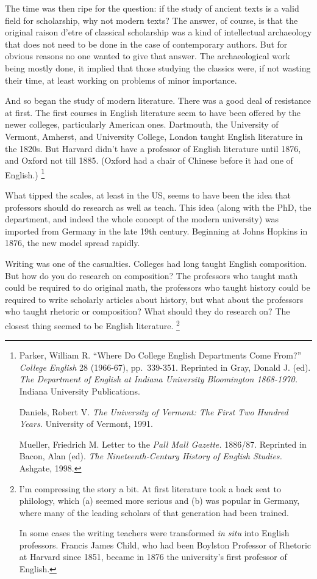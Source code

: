 The time was then ripe for the question: if the study of ancient texts
is a valid field for scholarship, why not modern texts? The answer, of
course, is that the original raison d'etre of classical scholarship was
a kind of intellectual archaeology that does not need to be done in the
case of contemporary authors. But for obvious reasons no one wanted to
give that answer. The archaeological work being mostly done, it implied
that those studying the classics were, if not wasting their time, at
least working on problems of minor importance.

And so began the study of modern literature. There was a good deal of
resistance at first. The first courses in English literature seem to
have been offered by the newer colleges, particularly American ones.
Dartmouth, the University of Vermont, Amherst, and University College,
London taught English literature in the 1820s. But Harvard didn't have a
professor of English literature until 1876, and Oxford not till 1885.
(Oxford had a chair of Chinese before it had one of English.) \footnote{Parker, William R. ``Where Do College English Departments Come
From?'' \emph{College English} 28 (1966-67), pp.~339-351. Reprinted in
Gray, Donald J. (ed). \emph{The Department of English at Indiana
University Bloomington 1868-1970.} Indiana University Publications.

Daniels, Robert V. \emph{The University of Vermont: The First Two
Hundred Years.} University of Vermont, 1991.

Mueller, Friedrich M. Letter to the \emph{Pall Mall Gazette.} 1886/87.
Reprinted in Bacon, Alan (ed). \emph{The Nineteenth-Century History of
English Studies.} Ashgate, 1998.}

What tipped the scales, at least in the US, seems to have been the idea
that professors should do research as well as teach. This idea (along
with the PhD, the department, and indeed the whole concept of the modern
university) was imported from Germany in the late 19th century.
Beginning at Johns Hopkins in 1876, the new model spread rapidly.

Writing was one of the casualties. Colleges had long taught English
composition. But how do you do research on composition? The professors
who taught math could be required to do original math, the professors
who taught history could be required to write scholarly articles about
history, but what about the professors who taught rhetoric or
composition? What should they do research on? The closest thing seemed
to be English literature. \footnote{I'm compressing the story a bit. At first literature took a back
seat to philology, which (a) seemed more serious and (b) was popular in
Germany, where many of the leading scholars of that generation had been
trained.

In some cases the writing teachers were transformed \emph{in situ} into
English professors. Francis James Child, who had been Boylston Professor
of Rhetoric at Harvard since 1851, became in 1876 the university's first
professor of English.}

